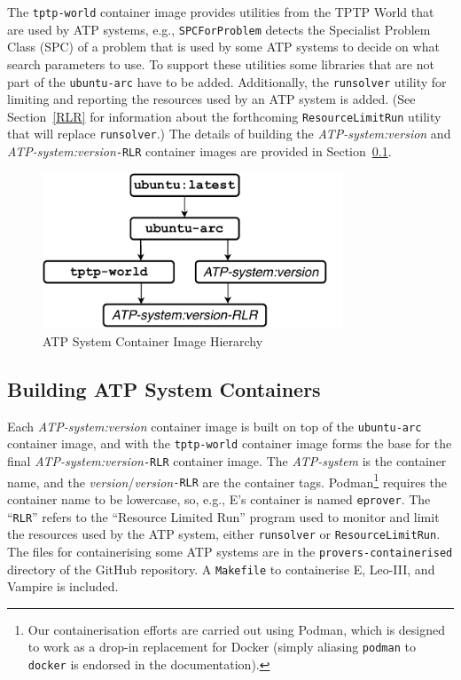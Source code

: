 \documentclass{easychair}
\begin{document}
The {\tt tptp-world} container image provides utilities from the TPTP World that are used by 
ATP systems, e.g., {\tt SPCForProblem} detects the Specialist Problem Class (SPC) \cite{SS01} of 
a problem that is used by some ATP systems to decide on what search parameters to use.
To support these utilities some libraries that are not part of the {\tt ubuntu-arc} have
to be added.
Additionally, the {\tt runsolver} utility for limiting and reporting the resources used by an 
ATP system is added.
(See Section~\ref{RLR} for information about the forthcoming {\tt ResourceLimitRun} utility
that will replace {\tt runsolver}.)
The details of building the {\em ATP-system:version} and {\em ATP-system:version}{\tt -RLR}
container images are provided in Section~\ref{BuildingATPSystemImages}.

\begin{figure}[htb]
\begin{center}
\includegraphics[width=0.8\textwidth]{ImageDAG} 
\caption{ATP System Container Image Hierarchy}
\label{ImageDAG}
\end{center}
\end{figure}

\subsection{Building ATP System Containers}
\label{BuildingATPSystemImages}

Each {\em ATP-system:version} container image is built on top of the {\tt ubuntu-arc} container 
image, and with the {\tt tptp-world} container image forms the base for the final 
{\em ATP-system:version}{\tt -RLR} container image.
The {\em ATP-system} is the container name, and the {\em version}/{\em version}{\tt -RLR} are 
the container tags.
Podman\footnote{Our containerisation efforts are carried out using Podman, which is designed to work as a drop-in replacement for Docker (simply aliasing {\tt podman} to {\tt docker} is endorsed in the documentation).} requires the container name to be lowercase, so, e.g., E's container is named {\tt eprover}.
The ``{\tt RLR}'' refers to the ``Resource Limited Run'' program used to monitor and limit the 
resources used by the ATP system, either {\tt runsolver} or {\tt ResourceLimitRun}.
The files for containerising some ATP systems are in the {\tt provers-containerised} directory 
of the GitHub repository.
A {\tt Makefile} to containerise E, Leo-III, and Vampire is included.
\end{document}
